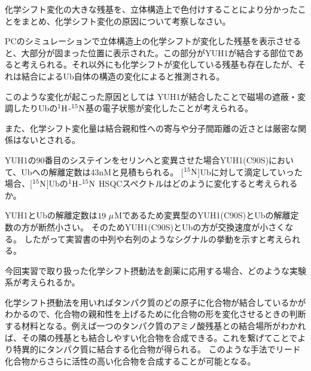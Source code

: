 \documentclass[a4paper,papersize,dvipdfmx]{jsarticle}
\begin{document}
\begin{tcolorbox}[colback=white,colbacktitle=black!10!white,coltitle=black,title={3}]
化学シフト変化の大きな残基を、立体構造上で色付けすることにより分かったことをまとめ、化学シフト変化の原因について考察しなさい。
\end{tcolorbox}

PCのシミュレーションで立体構造上の化学シフトが変化した残基を表示させると、大部分が固まった位置に表示された。この部分がYUH1が結合する部位であると考えられる。それ以外にも化学シフトが変化している残基も存在したが、それは結合によるUb自体の構造の変化によると推測される。

このような変化が起こった原因としては
YUH1が結合したことで磁場の遮蔽・変調したりUbの$\rm ^1H$-$\rm ^{15}N$基の電子状態が変化したことが考えられる。

また、化学シフト変化量は結合親和性への寄与や分子間距離の近さとは厳密な関係はないとされる。


\begin{tcolorbox}[colback=white,colbacktitle=black!10!white,coltitle=black,title={4}]
YUH1の90番目のシステインをセリンへと変異させた場合YUH1(C90S)において、Ubへの解離定数は43nMと見積もられる。
[$\rm ^{15}N$]Ubに対して滴定していった場合、[$\rm ^{15}N$]Ubの$\rm ^1H$-$\rm ^{15}N$ HSQCスペクトルはどのように変化すると考えられるか。
\end{tcolorbox}

YUH1とUbの解離定数は$19 \ \rm \mu$Mであるため変異型のYUH1(C90S)とUbの解離定数の方が断然小さい。
そのためYUH1(C90S)とUbの方が交換速度が小さくなる。
したがって実習書の中列や右列のようなシグナルの挙動を示すと考えられる。


\begin{tcolorbox}[colback=white,colbacktitle=black!10!white,coltitle=black,title={5}]
今回実習で取り扱った化学シフト摂動法を創薬に応用する場合、どのような実験系が考えられるか。
\end{tcolorbox}

化学シフト摂動法を用いればタンパク質のどの原子に化合物が結合しているかがわかるので、化合物の親和性を上げるために化合物の形を変化させるときの判断する材料となる。例えば一つのタンパク質のアミノ酸残基との結合場所がわかれば、その隣の残基とも結合しやすい化合物を合成できる。これを繋げてことでより特異的にタンパク質に結合する化合物が得られる。
このような手法でリード化合物からさらに活性の高い化合物を合成することが可能となる。
\end{document}
